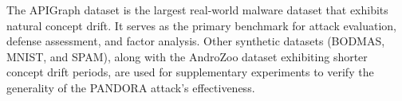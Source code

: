 \documentclass[lettersize,journal]{IEEEtran}
\begin{document}
The APIGraph dataset is the largest real-world malware dataset that exhibits natural concept drift.
It serves as the primary benchmark for attack evaluation, defense assessment, and factor analysis.
Other synthetic datasets (BODMAS, MNIST, and SPAM), along with the AndroZoo dataset exhibiting shorter concept drift periods, are used for supplementary experiments to verify the generality of the PANDORA attack’s effectiveness.
\end{document}
